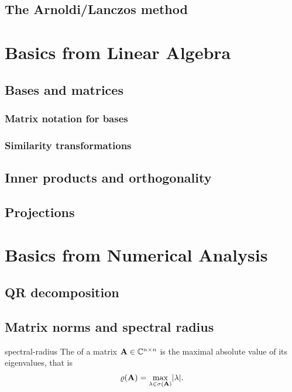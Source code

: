 \section{The Arnoldi/Lanczos method}



\appendix
\chapter{Basics from Linear Algebra}
\section{Bases and matrices}
\subsection{Matrix notation for bases}

\subsection{Similarity transformations}

\section{Inner products and orthogonality}

\section{Projections}


\chapter{Basics from Numerical Analysis}

\section{QR decomposition}


\section{Matrix norms and spectral radius}

\begin{Definition}{spectral-radius}
  The  of a matrix $\mathbf A\in\mathbb C^{n\times n}$ is the
  maximal absolute value of its eigenvalues, that is
  \begin{gather}
    \varrho(\mathbf A) = \max_{\lambda\in\sigma(\mathbf A)} \lvert\lambda\rvert.
  \end{gather}
\end{Definition}

